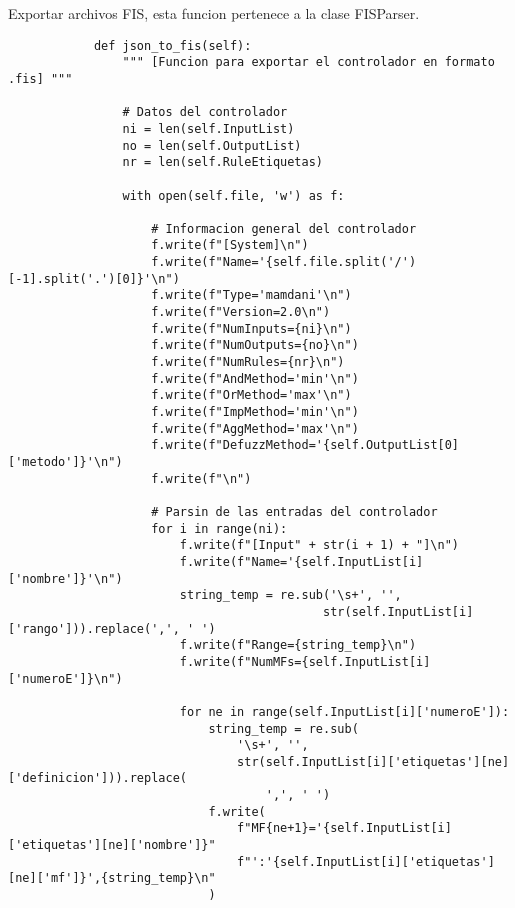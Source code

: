     \begin{longlisting}
        \caption[Exportar archivos FIS]{Exportar archivos FIS, esta funcion pertenece a la clase FISParser.}
        \label{code:anexoF3}				
        \begin{verbatim}
            def json_to_fis(self):
                """ [Funcion para exportar el controlador en formato .fis] """

                # Datos del controlador
                ni = len(self.InputList)
                no = len(self.OutputList)
                nr = len(self.RuleEtiquetas)

                with open(self.file, 'w') as f:

                    # Informacion general del controlador
                    f.write(f"[System]\n")
                    f.write(f"Name='{self.file.split('/')[-1].split('.')[0]}'\n")
                    f.write(f"Type='mamdani'\n")
                    f.write(f"Version=2.0\n")
                    f.write(f"NumInputs={ni}\n")
                    f.write(f"NumOutputs={no}\n")
                    f.write(f"NumRules={nr}\n")
                    f.write(f"AndMethod='min'\n")
                    f.write(f"OrMethod='max'\n")
                    f.write(f"ImpMethod='min'\n")
                    f.write(f"AggMethod='max'\n")
                    f.write(f"DefuzzMethod='{self.OutputList[0]['metodo']}'\n")
                    f.write(f"\n")

                    # Parsin de las entradas del controlador
                    for i in range(ni):
                        f.write(f"[Input" + str(i + 1) + "]\n")
                        f.write(f"Name='{self.InputList[i]['nombre']}'\n")
                        string_temp = re.sub('\s+', '',
                                            str(self.InputList[i]['rango'])).replace(',', ' ')
                        f.write(f"Range={string_temp}\n")
                        f.write(f"NumMFs={self.InputList[i]['numeroE']}\n")

                        for ne in range(self.InputList[i]['numeroE']):
                            string_temp = re.sub(
                                '\s+', '',
                                str(self.InputList[i]['etiquetas'][ne]['definicion'])).replace(
                                    ',', ' ')
                            f.write(
                                f"MF{ne+1}='{self.InputList[i]['etiquetas'][ne]['nombre']}"
                                f"':'{self.InputList[i]['etiquetas'][ne]['mf']}',{string_temp}\n"
                            )


\end{verbatim}
\end{longlisting}

